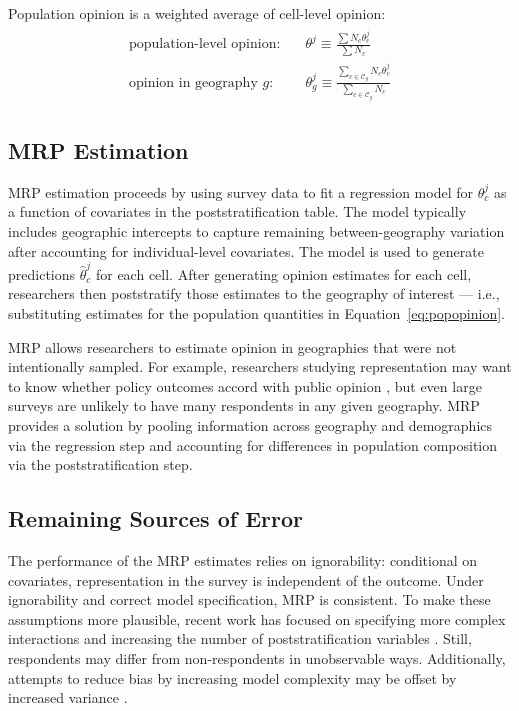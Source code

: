 Population opinion is a weighted average of cell-level opinion:
\begin{align}
\begin{split}
	\text{population-level opinion:} \quad &\theta^j \equiv \frac{\sum  N_c \theta_c^j}{\sum N_c} \\
	\text{opinion in geography $g$:} \quad &\theta_g^j \equiv \frac{\sum_{c \in \mathcal{C}_g}  N_c \theta_c^j}{\sum_{c \in \mathcal{C}_g} N_c} 
	\label{eq:popopinion}
\end{split}
\end{align}

\subsection{MRP Estimation}

MRP estimation proceeds by using survey data to fit a regression model for $\theta^j_c$ as a function of covariates in the poststratification table.
The model typically includes geographic intercepts to capture remaining between-geography variation after accounting for individual-level covariates.
The model is used to generate predictions $\hat{\theta}^j_c$ for each cell.
After generating opinion estimates for each cell, researchers then poststratify those estimates to the geography of interest ---  i.e., substituting estimates for the population quantities in Equation~\ref{eq:popopinion}.

MRP allows researchers to estimate opinion in geographies that were not intentionally sampled. 
For example, researchers studying representation may want to know whether policy outcomes accord with public opinion \citep[e.g.,][]{LP:2012,Tausanovitch2014}, but even large surveys are unlikely to have many respondents in any given geography.
MRP provides a solution by pooling information across geography and demographics via the regression step and accounting for differences in population composition via the poststratification step. 

\subsection{Remaining Sources of Error}

The performance of the MRP estimates relies on ignorability: conditional on covariates, representation in the survey is independent of the outcome.
Under ignorability and correct model specification, MRP is consistent.
To make these assumptions more plausible, recent work has focused on specifying more complex interactions \citep[e.g.,][]{GG:2013,B:2019,BLW:2022,G:2023} and increasing the number of poststratification variables \citep{LW:2017}.
Still, respondents may differ from non-respondents in unobservable ways. Additionally, attempts to reduce bias by increasing model complexity may be offset by increased variance \citep{BH:2013,WR:2012}.

